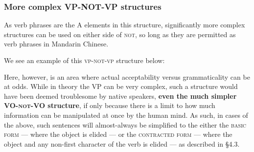 \documentclass[12pt, UTF8]{article}
\begin{document}
\subsubsection{More complex VP-NOT-VP structures}
As verb phrases are the \textsc{A} elements in this structure, significantly more complex structures can be used on either side of \textsc{not}, so long as they are permitted as verb phrases in Mandarin Chinese.

We see an example of this \textsc{vp-not-vp} structure below:
\begin{exe}


\end{exe}

Here, however, is an area where actual acceptability versus grammaticality can be at odds. While in theory the VP can be very complex, such a structure would have been deemed troublesome by native speakers, \textbf{even the much simpler \textsc{VO-not-VO} structure}, if only because there is a limit to how much information can be manipulated at once by the human mind. As such, in cases of the above, such sentences will almost-always be simplified to the either the \textsc{basic form} --- where the object is elided --- or the \textsc{contracted form} --- where the object and any non-first character of the verb is elided --- as described in \S 4.3.


\begin{exe}



\end{exe}
\end{document}
